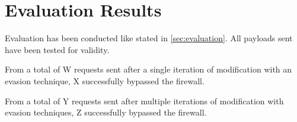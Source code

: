 \section{Evaluation Results}
\label{sec:EvaluationResults}
Evaluation has been conducted like stated in \ref{sec:evaluation}. 
All payloads sent have been tested for validity.

From a total of {\color{red} W } requests sent after a single iteration of modification with an evasion technique, {\color{red} X } successfully bypassed the firewall. 

From a total of {\color{red} Y } requests sent after multiple iterations of modification with evasion techniques, {\color{red} Z } successfully bypassed the firewall. 

